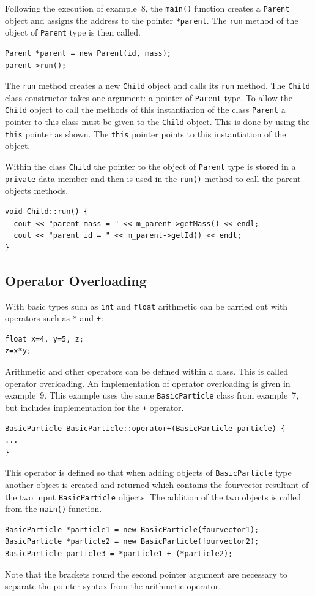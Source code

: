 \documentclass[11pt,a4paper]{scrartcl}
\def\main{\texttt{main()}$\;$}
\begin{document}
Following the execution of example~8, the \main function creates a
\texttt{Parent} object and assigns the address to the pointer
\texttt{*parent}.  The \texttt{run} method of the object of
\texttt{Parent} type is then called.
%
\begin{verbatim}
Parent *parent = new Parent(id, mass);
parent->run();
\end{verbatim}
%
The \texttt{run} method creates a new \texttt{Child} object and calls
its \texttt{run} method.  The \texttt{Child} class constructor takes
one argument: a pointer of \texttt{Parent} type.  To allow the
\texttt{Child} object to call the methods of this instantiation
of the class \texttt{Parent} a pointer to this class must be
given to the \texttt{Child} object.  This is done by using the \texttt{this}
pointer as shown.  The \texttt{this} pointer points to this
instantiation of the object.

Within the class \texttt{Child} the pointer to the object of
\texttt{Parent} type is stored in a \texttt{private} data member and
then is used in the \texttt{run()} method to call the parent objects methods.
\begin{verbatim}
void Child::run() {
  cout << "parent mass = " << m_parent->getMass() << endl;
  cout << "parent id = " << m_parent->getId() << endl;
}
\end{verbatim}


\subsection{Operator Overloading}
With basic types such as \texttt{int} and \texttt{float} arithmetic
can be carried out with operators such as \texttt{*} and \texttt{+}:
\begin{verbatim}
float x=4, y=5, z;
z=x*y;
\end{verbatim}

Arithmetic and other operators can be defined within a class.  This is
called operator overloading.  An implementation of operator
overloading is given in example~9.  This example uses the same
\texttt{BasicParticle} class from example~7, but includes
implementation for the \texttt{+} operator.
\begin{verbatim}
BasicParticle BasicParticle::operator+(BasicParticle particle) {
...
}
\end{verbatim}
This operator is defined so that when adding objects of
\texttt{BasicParticle} type another object is created and returned
which contains the fourvector resultant of the two input
\texttt{BasicParticle} objects.  The addition of the two objects is
called from the \main function.
\begin{verbatim}
BasicParticle *particle1 = new BasicParticle(fourvector1);
BasicParticle *particle2 = new BasicParticle(fourvector2);
BasicParticle particle3 = *particle1 + (*particle2);
\end{verbatim}
Note that the brackets round the second pointer argument are necessary
to separate the pointer syntax from the arithmetic operator.
\end{document}
